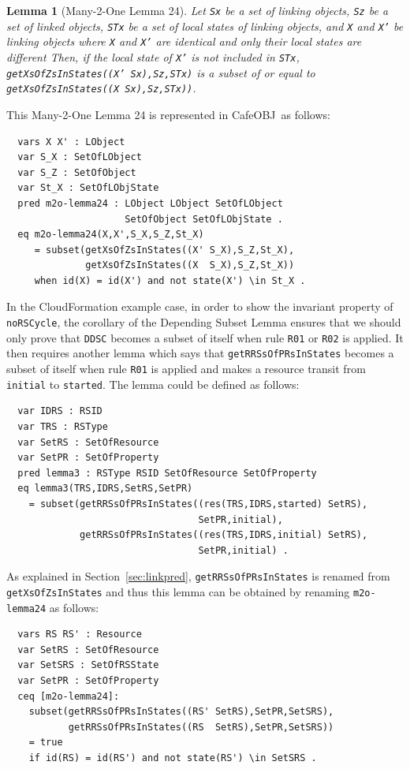 \documentclass[12pt]{report}
\newtheorem{lemma}{Lemma}
\newcommand{\stt}[1]{{\small{\tt {#1}}}}
\newcommand{\cafeobj}{{\sf CafeOBJ}~}
\begin{document}
\begin{lemma}[Many-2-One Lemma 24]
  Let {\tt Sx} be a set of linking objects, {\tt Sz} be a set of
  linked objects, {\tt STx} be a set of local states of linking
  objects, and {\tt X} and {\tt X'} be linking objects where {\tt X}
  and {\tt X'} are identical and only their local states are different
  Then, if the local state of {\tt X'} is not included in {\tt STx},
  \stt{getXsOfZsInStates((X' Sx),Sz,STx)} is a subset of or equal to
  \stt{getXsOfZsInStates((X Sx),Sz,STx))}.
\end{lemma}
This Many-2-One Lemma 24 is represented in \cafeobj as follows:
\small
\begin{verbatim}
  vars X X' : LObject
  var S_X : SetOfLObject
  var S_Z : SetOfObject
  var St_X : SetOfLObjState
  pred m2o-lemma24 : LObject LObject SetOfLObject
                     SetOfObject SetOfLObjState .
  eq m2o-lemma24(X,X',S_X,S_Z,St_X)
     = subset(getXsOfZsInStates((X' S_X),S_Z,St_X),
              getXsOfZsInStates((X  S_X),S_Z,St_X))
     when id(X) = id(X') and not state(X') \in St_X .
\end{verbatim}
\normalsize
In the CloudFormation example case, in order to show the invariant
property of {\tt noRSCycle}, the corollary of the Depending Subset
Lemma ensures that we should only prove that {\tt DDSC} becomes a
subset of itself when rule {\tt R01} or {\tt R02} is applied. It then
requires another lemma which says that {\tt getRRSsOfPRsInStates}
becomes a subset of itself when rule {\tt R01} is applied and makes a
resource transit from {\tt initial} to {\tt started}.  The lemma could
be defined as follows:
\small
\begin{verbatim}
  var IDRS : RSID 
  var TRS : RSType
  var SetRS : SetOfResource
  var SetPR : SetOfProperty
  pred lemma3 : RSType RSID SetOfResource SetOfProperty
  eq lemma3(TRS,IDRS,SetRS,SetPR)
    = subset(getRRSsOfPRsInStates((res(TRS,IDRS,started) SetRS),
                                  SetPR,initial), 
             getRRSsOfPRsInStates((res(TRS,IDRS,initial) SetRS),
                                  SetPR,initial) .
\end{verbatim}
\normalsize
As explained in Section~\ref{sec:linkpred}, {\tt getRRSsOfPRsInStates}
is renamed from {\tt getXsOfZsInStates} and thus this lemma can be obtained
by renaming {\tt m2o-lemma24} as follows:
\small
\begin{verbatim}
  vars RS RS' : Resource
  var SetRS : SetOfResource
  var SetSRS : SetOfRSState
  var SetPR : SetOfProperty
  ceq [m2o-lemma24]:
    subset(getRRSsOfPRsInStates((RS' SetRS),SetPR,SetSRS),
           getRRSsOfPRsInStates((RS  SetRS),SetPR,SetSRS))
    = true
    if id(RS) = id(RS') and not state(RS') \in SetSRS .
\end{verbatim}
\normalsize
\end{document}
